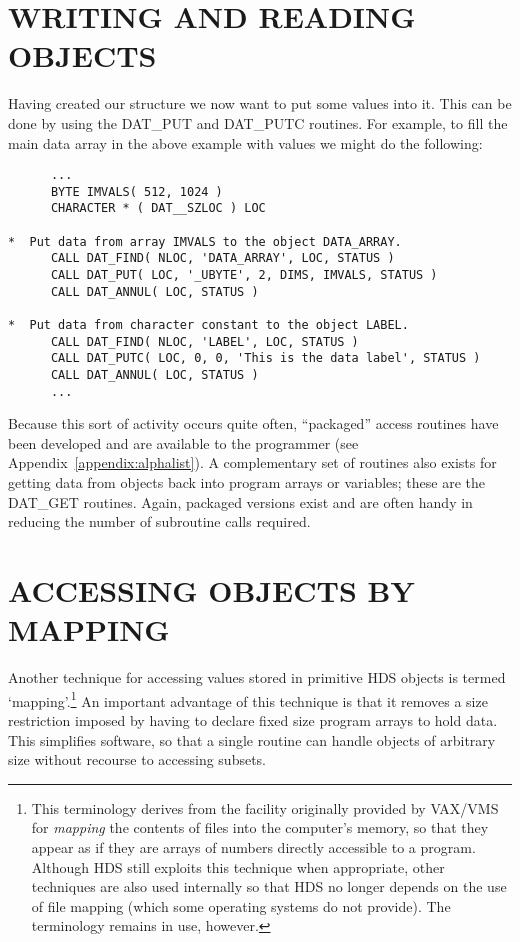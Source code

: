 \section{WRITING AND READING OBJECTS}

Having created our structure we now want to put some values into it. This
can be done by using the DAT\_PUT and DAT\_PUTC routines. For
example, to fill the main data array in the above example with values we
might do the following: 

\small
\begin{verbatim}
      ...
      BYTE IMVALS( 512, 1024 )
      CHARACTER * ( DAT__SZLOC ) LOC

*  Put data from array IMVALS to the object DATA_ARRAY.
      CALL DAT_FIND( NLOC, 'DATA_ARRAY', LOC, STATUS )
      CALL DAT_PUT( LOC, '_UBYTE', 2, DIMS, IMVALS, STATUS )
      CALL DAT_ANNUL( LOC, STATUS )

*  Put data from character constant to the object LABEL.
      CALL DAT_FIND( NLOC, 'LABEL', LOC, STATUS )
      CALL DAT_PUTC( LOC, 0, 0, 'This is the data label', STATUS )
      CALL DAT_ANNUL( LOC, STATUS )
      ...
\end{verbatim}
\normalsize

Because this sort of activity occurs quite often, ``packaged'' access routines
have been developed and are available to the programmer (see
Appendix~\ref{appendix:alphalist}).  A complementary set of routines also
exists for getting data from objects back into program arrays or variables;
these are the DAT\_GET routines. Again, packaged versions exist and are
often handy in reducing the number of  subroutine calls required.

\section{ACCESSING OBJECTS BY MAPPING}

Another technique for accessing values stored in primitive HDS objects is
termed `mapping'.\footnote{This terminology derives from the facility
originally provided by VAX/VMS for {\em mapping} the contents of files into the
computer's memory, so that they appear as if they are arrays of numbers
directly accessible to a program. Although HDS still exploits this technique
when appropriate, other techniques are also used internally so that HDS no
longer depends on the use of file mapping (which some operating systems do not
provide). The terminology remains in use, however.} An important advantage of
this technique is that it removes a size restriction imposed by having to
declare fixed size program arrays to hold data. This simplifies software, so
that a single routine can handle objects of arbitrary size without recourse to
accessing subsets. 

